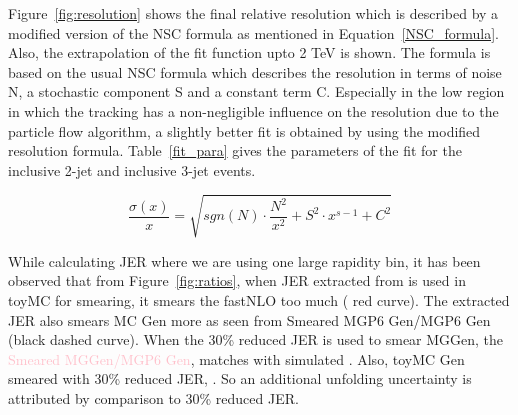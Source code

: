 Figure~\ref{fig:resolution} shows the final relative resolution which is described by a modified version of the NSC formula as mentioned in Equation~\ref{NSC_formula}. Also, the extrapolation of the fit function upto 2 TeV is shown. The formula is based on the usual NSC formula which describes the resolution in terms of noise N, a stochastic component S and a constant term C. Especially in the low \httwo region in which the tracking has a non-negligible influence on the resolution due to the
particle flow algorithm, a slightly better fit is obtained by using the modified resolution formula. Table~\ref{fit_para} gives the 
parameters of the fit for the inclusive 2-jet and inclusive 3-jet events.

\begin{equation}
  \label{NSC_formula}
  \frac{\sigma (x)}{x} = \sqrt{sgn(N) \cdot\frac{N^{2}}{x^{2}}+S^{2}\cdot x^{s-1}+C^{2}} 
\end{equation}

While calculating JER where we are using one large rapidity bin, it has been observed that from Figure~\ref{fig:ratios}, when JER extracted from  is used in toyMC for smearing, it smears the fastNLO too much (\mycolor
{red curve}). The extracted JER also smears MC Gen more as seen from Smeared MG\plus P6 Gen/MG\plus P6 Gen (black dashed curve). When the 30\% reduced JER  is used to smear MG\plus Gen, the \textcolor{pink}{Smeared MG\plus Gen/MG\plus P6 Gen}, matches with simulated . Also, toyMC Gen smeared with 30\% reduced  JER, . So an additional unfolding uncertainty is attributed by comparison to 30\% reduced JER.  

